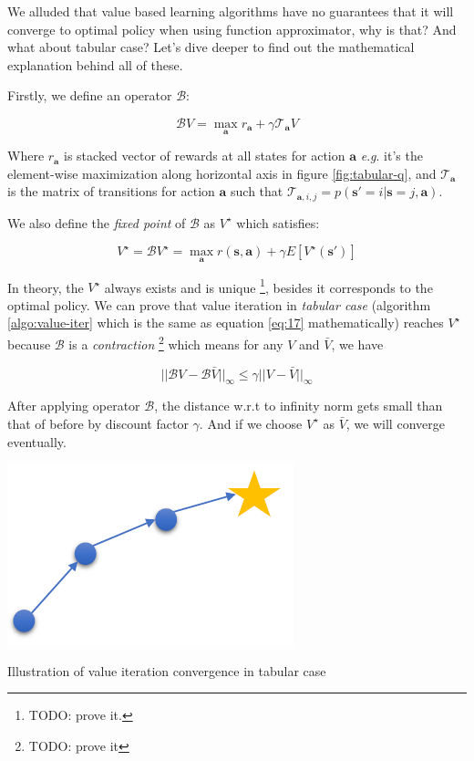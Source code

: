 \documentclass{tufte-handout}
\newcommand{\eg}{\textit{e}.\textit{g}. }
\newcommand{\s}{\mathbf{s}}
\newcommand{\act}{\mathbf{a}}
\begin{document}
We alluded that value based learning algorithms have no guarantees that it will converge to optimal policy when using function approximator, why is that?
And what about tabular case? Let's dive deeper to find out the mathematical explanation behind all of these.

Firstly, we define an operator $\mathcal{B}$:

\begin{equation}
\label{eq:16}
\mathcal{B}V = \max_\act r_\act + \gamma \mathcal{T}_\act V
\end{equation}

Where $r_\act$ is stacked vector of rewards at all states for action $\act$ \eg it's the element-wise maximization along horizontal axis in figure \ref{fig:tabular-q},
and $\mathcal{T}_\act$ is the matrix of transitions for action $\act$ such that $\mathcal{T}_{\act, i, j} = p(\s' = i | \s = j, \act)$.

We also define the \emph{fixed point} of $\mathcal{B}$ as $V^\star$ which satisfies:

\begin{equation}
\label{eq:17}
V^\star = \mathcal{B} V^\star = \max_\act r(\s, \act) + \gamma E[V^\star (\s')]
\end{equation}

In theory, the $V^\star$ always exists and is unique \thanks{TODO: prove it.}, besides it corresponds to the optimal policy.
We can prove that value iteration in \emph{tabular case} (algorithm \ref{algo:value-iter} which is the same as equation \ref{eq:17} mathematically) reaches $V^\star$ because
$\mathcal{B}$ is a \emph{contraction} \thanks{TODO: prove it} which means for any $V$ and $\bar{V}$, we have

\begin{equation}
\label{eq:18}
|| \mathcal{B}V - \mathcal{B} \bar{V} || _\infty \le \gamma || V - \bar{V} || _\infty
\end{equation}

After applying operator $\mathcal{B}$, the distance w.r.t to infinity norm gets small than that of before by discount factor $\gamma$. And if we choose
$V^\star$ as $\bar{V}$, we will converge eventually.

\begin{marginfigure}
\centering
\includegraphics[width=\linewidth]{converge-b}
\caption{Illustration of value iteration convergence in tabular case}
\label{fig:conv-b}
\end{marginfigure}
\end{document}
